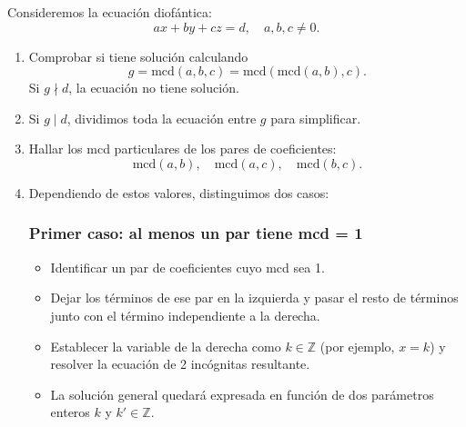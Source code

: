 \documentclass[a4paper,12pt]{article}
\begin{document}
\begin{procedimiento}
Consideremos la ecuación diofántica:
\[
a x + b y + c z = d, \quad a,b,c \neq 0.
\]

\begin{enumerate}
    \item Comprobar si tiene solución calculando
    \[
    g = \text{mcd}(a,b,c) = \text{mcd}(\text{mcd}(a,b),c).
    \]
    Si \(g \nmid d\), la ecuación no tiene solución.
    
    \item Si \(g \mid d\), dividimos toda la ecuación entre \(g\) para simplificar.
    
    \item Hallar los mcd particulares de los pares de coeficientes:
    \[
    \text{mcd}(a,b), \quad \text{mcd}(a,c), \quad \text{mcd}(b,c).
    \]
    
    \item Dependiendo de estos valores, distinguimos dos casos:
    
    \subsubsection*{Primer caso: al menos un par tiene mcd = 1}
    \begin{itemize}
        \item Identificar un par de coeficientes cuyo mcd sea 1.
        \item Dejar los términos de ese par en la izquierda y pasar el resto de términos junto con el término independiente a la derecha.
        \item Establecer la variable de la derecha como \(k \in \mathbb{Z}\) (por ejemplo, \(x = k\)) y resolver la ecuación de 2 incógnitas resultante.
        \item La solución general quedará expresada en función de dos parámetros enteros \(k\) y \(k' \in \mathbb{Z}\).
    \end{itemize}


\end{enumerate}
\end{procedimiento}
\end{document}
